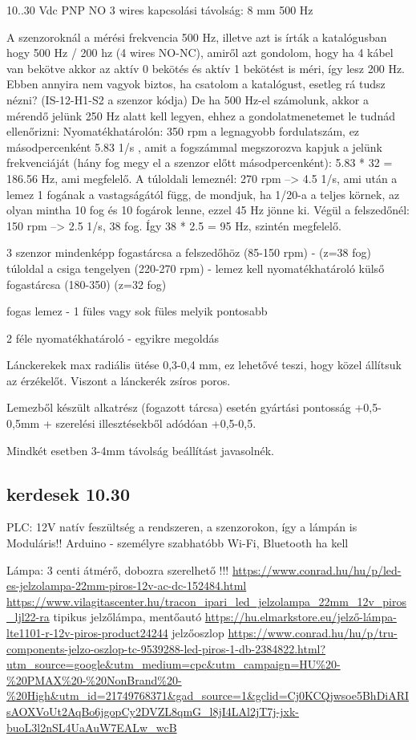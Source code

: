 \documentclass{article}
\begin{document}
	10..30 Vdc
	PNP NO
	3 wires
	kapcsolási távolság: 8 mm
	500 Hz
	
	A szenzoroknál a mérési frekvencia 500 Hz, illetve azt is írták a katalógusban hogy 500 Hz / 200 hz (4 wires NO-NC), amiről azt gondolom, hogy ha 4 kábel van bekötve akkor az aktív 0 bekötés és aktív 1 bekötést is méri, így lesz 200 Hz. Ebben annyira nem vagyok biztos, ha csatolom a katalógust, esetleg rá tudsz nézni? (IS-12-H1-S2 a szenzor kódja)
	De ha 500 Hz-el számolunk, akkor a mérendő jelünk 250 Hz alatt kell legyen, ehhez a gondolatmenetemet le tudnád ellenőrizni:
	Nyomatékhatárolón: 350 rpm a legnagyobb fordulatszám, ez másodpercenként 5.83 1/s , amit a fogszámmal megszorozva kapjuk a jelünk frekvenciáját (hány fog megy el a szenzor előtt másodpercenként): 5.83 * 32 = 186.56 Hz, ami megfelelő.
	A túloldali lemeznél: 270 rpm --> 4.5 1/s, ami után a lemez 1 fogának a vastagságától függ, de mondjuk, ha 1/20-a a teljes körnek, az olyan mintha 10 fog és 10 fogárok lenne, ezzel 45 Hz jönne ki.
	Végül a felszedőnél: 150 rpm --> 2.5 1/s, 38 fog. Így 38 * 2.5 = 95 Hz, szintén megfelelő.	
	
	
	3 szenzor mindenképp
	fogastárcsa a felszedőhöz (85-150 rpm) - (z=38 fog)
	túloldal a csiga tengelyen (220-270 rpm) - lemez kell
	nyomatékhatároló külső fogastárcsa (180-350) (z=32 fog)
	
	fogas lemez - 1 füles vagy sok füles melyik pontosabb
	
	2 féle nyomatékhatároló - egyikre megoldás
	
	Lánckerekek max radiális ütése 0,3-0,4 mm, ez lehetővé teszi, hogy közel állítsuk az érzékelőt. Viszont a lánckerék zsíros poros.
	
	Lemezből készült alkatrész (fogazott tárcsa) esetén gyártási pontosság +0,5-0,5mm + szerelési illesztésekből adódóan +0,5-0,5.
	
	Mindkét esetben 3-4mm távolság beállítást javasolnék. 
	
	\subsection{kerdesek 10.30}
	
	PLC: 12V
	natív feszültség a rendszeren, a szenzorokon, így a lámpán is
	Moduláris!!
	Arduino - személyre szabhatóbb
	Wi-Fi, Bluetooth ha kell
	
	Lámpa:
	3 centi átmérő, dobozra szerelhető !!!
	\url{https://www.conrad.hu/hu/p/led-es-jelzolampa-22mm-piros-12v-ac-dc-152484.html}
	\url{https://www.vilagitascenter.hu/tracon_ipari_led_jelzolampa_22mm_12v_piros_ljl22-ra}
	tipikus jelzőlámpa, mentőautó 
	\url{https://hu.elmarkstore.eu/jelző-lámpa-lte1101-r-12v-piros-product24244}
	jelzőoszlop \url{https://www.conrad.hu/hu/p/tru-components-jelzo-oszlop-tc-9539288-led-piros-1-db-2384822.html?utm_source=google&utm_medium=cpc&utm_campaign=HU%20-%20PMAX%20-%20NonBrand%20-%20High&utm_id=21749768371&gad_source=1&gclid=Cj0KCQjwsoe5BhDiARIsAOXVoUt2AqBo6jgopCy2DVZL8qmG_l8jI4LAl2jT7j-jxk-buoL3l2nSL4UaAuW7EALw_wcB}
	
\end{document}
